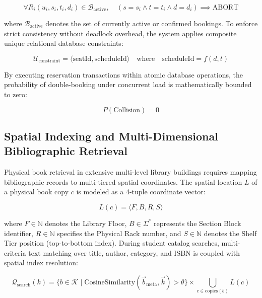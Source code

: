 \begin{equation}
\forall R_i(u_i, s_i, t_i, d_i) \in \mathcal{B}_{\text{active}}, \quad (s = s_i \land t = t_i \land d = d_i) \implies \text{ABORT}
\end{equation}

where $\mathcal{B}_{\text{active}}$ denotes the set of currently active or confirmed bookings. To enforce strict consistency without deadlock overhead, the system applies composite unique relational database constraints:

\begin{equation}
\mathcal{U}_{\text{constraint}} = \langle \text{seatId}, \text{scheduleId} \rangle \quad \text{where} \quad \text{scheduleId} = f(d, t)
\end{equation}

By executing reservation transactions within atomic database operations, the probability of double-booking under concurrent load is mathematically bounded to zero:

\begin{equation}
P(\text{Collision}) = 0
\end{equation}

\subsection{Spatial Indexing and Multi-Dimensional Bibliographic Retrieval}
Physical book retrieval in extensive multi-level library buildings requires mapping bibliographic records to multi-tiered spatial coordinates. The spatial location $L$ of a physical book copy $c$ is modeled as a 4-tuple coordinate vector:

\begin{equation}
L(c) = \langle F, B, R, S \rangle
\end{equation}

where $F \in \mathbb{N}$ denotes the Library Floor, $B \in \Sigma^*$ represents the Section Block identifier, $R \in \mathbb{N}$ specifies the Physical Rack number, and $S \in \mathbb{N}$ denotes the Shelf Tier position (top-to-bottom index). During student catalog searches, multi-criteria text matching over title, author, category, and ISBN is coupled with spatial index resolution:

\begin{equation}
\mathcal{Q}_{\text{search}}(k) = \{ b \in \mathcal{K} \mid \text{CosineSimilarity}(\vec{b}_{\text{meta}}, \vec{k}) > \theta \} \times \bigcup_{c \in \text{copies}(b)} L(c)
\end{equation}

